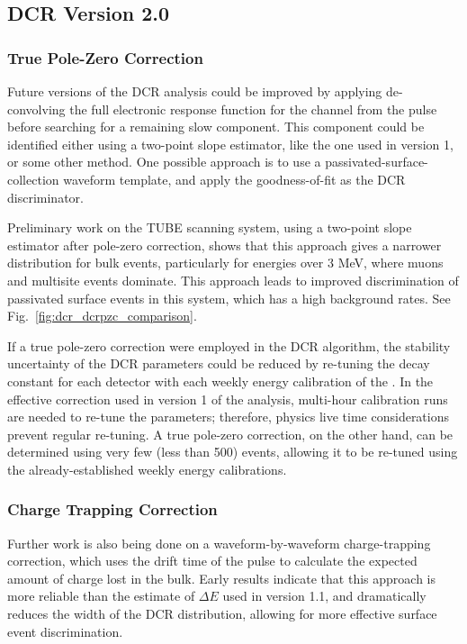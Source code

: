 \subsection{DCR Version 2.0}
\subsubsection{True Pole-Zero Correction}
Future versions of the DCR analysis could be improved by applying de-convolving the full electronic response function for the channel from the pulse before searching for a remaining slow component. This component could be identified either using a two-point slope estimator, like the one used in version 1, or some other method. One possible approach is to use a passivated-surface-collection waveform template, and apply the goodness-of-fit as the DCR discriminator. 

Preliminary work on the TUBE scanning system, using a two-point slope estimator after pole-zero correction, shows that this approach gives a narrower distribution for bulk events, particularly for energies over 3 MeV, where muons and multisite events dominate. This approach leads to improved discrimination of passivated surface events in this system, which has a high background rates. See Fig.~\ref{fig:dcr_dcrpzc_comparison}.

If a true pole-zero correction were employed in the DCR algorithm, the stability uncertainty of the DCR parameters could be reduced by re-tuning the decay constant for each detector with each weekly energy calibration of the \DEM. In the effective correction used in version 1 of the analysis, multi-hour calibration runs are needed to re-tune the parameters; therefore, physics live time considerations prevent regular re-tuning. A true pole-zero correction, on the other hand, can be determined using very few (less than 500) events, allowing it to be re-tuned using the already-established weekly energy calibrations. 

\subsubsection{Charge Trapping Correction}
Further work is also being done on a waveform-by-waveform charge-trapping correction, which uses the drift time of the pulse to calculate the expected amount of charge lost in the bulk. Early results indicate that this approach is more reliable than the estimate of $\Delta E$ used in version 1.1, and dramatically reduces the width of the DCR distribution, allowing for more effective surface event discrimination. 

